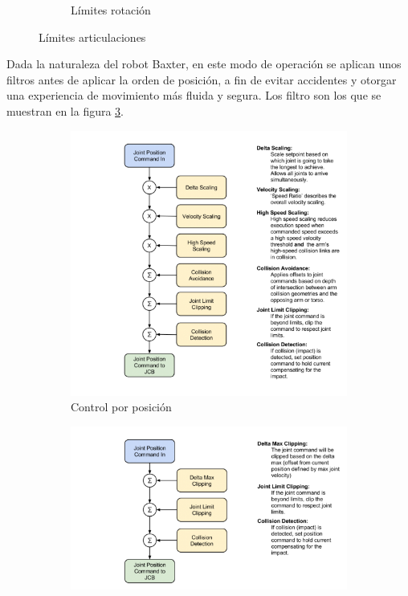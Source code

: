 \begin{figure}[]
\begin{subfigure}[b]{0.4\textwidth}
		\caption{Límites rotación}
		\label{fig:desarrollo/limits2}
	\end{subfigure}
	\caption{Límites articulaciones}
	\label{fig:desarrollo/limits}
\end{figure}

Dada la naturaleza del robot Baxter, en este modo de operación se aplican unos filtros antes de aplicar la orden de posición, a fin de evitar accidentes y otorgar una experiencia de movimiento más fluida y segura. Los filtro son los que se muestran en la figura \ref{fig:desarrollo/position_filters}.

\begin{figure}[]
	\centering
	\begin{subfigure}[b]{0.24\textwidth}
		\includegraphics[trim=0 0 235 0, clip, width=\textwidth]{imagenes/metodos/baxter_position_filters.png}
		\caption{Control por posición}
		\label{fig:desarrollo/position_filters}
	\end{subfigure}
	\begin{subfigure}[b]{0.24\textwidth}
		\centering
		\includegraphics[trim=0 0 230 0, clip, width=\textwidth]{imagenes/metodos/baxter_position_raw_filters.png}

\end{subfigure}
\end{figure}
